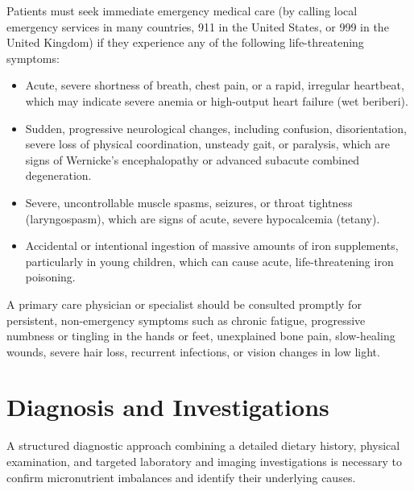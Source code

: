 Patients must seek immediate emergency medical care (by calling local emergency services in many countries, 911 in the United States, or 999 in the United Kingdom) if they experience any of the following life-threatening symptoms:
\begin{itemize}
    \item Acute, severe shortness of breath, chest pain, or a rapid, irregular heartbeat, which may indicate severe anemia or high-output heart failure (wet beriberi).
    \item Sudden, progressive neurological changes, including confusion, disorientation, severe loss of physical coordination, unsteady gait, or paralysis, which are signs of Wernicke's encephalopathy or advanced subacute combined degeneration.
    \item Severe, uncontrollable muscle spasms, seizures, or throat tightness (laryngospasm), which are signs of acute, severe hypocalcemia (tetany).
    \item Accidental or intentional ingestion of massive amounts of iron supplements, particularly in young children, which can cause acute, life-threatening iron poisoning.
\end{itemize}

A primary care physician or specialist should be consulted promptly for persistent, non-emergency symptoms such as chronic fatigue, progressive numbness or tingling in the hands or feet, unexplained bone pain, slow-healing wounds, severe hair loss, recurrent infections, or vision changes in low light.

\section*{Diagnosis and Investigations}
A structured diagnostic approach combining a detailed dietary history, physical examination, and targeted laboratory and imaging investigations is necessary to confirm micronutrient imbalances and identify their underlying causes.


